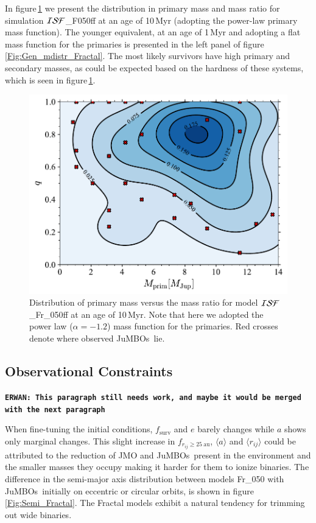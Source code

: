 \documentclass[submission,phys]{lib/SciPost}
\newcommand{\erwan}[1] {{\texttt{\textbf{ERWAN: #1}}} }
\newcommand{\jumbos}{\mbox{JuMBOs}}
\begin{document}
In figure\,\ref{Fig:SimTime_MPrimQ} we present the distribution in
primary mass and mass ratio for simulation ${\cal ISF}$\_F050ff at an
age of 10\,Myr (adopting the power-law primary mass function). The
younger equivalent, at an age of 1\,Myr and adopting a flat mass
function for the primaries is presented in the left panel of
figure\,\ref{Fig:Gen_mdistr_Fractal}.  The most likely survivors have
high primary and secondary masses, as could be expected based on the
hardness of these systems, which is seen in
figure\,\ref{Fig:SimTime_MPrimQ}.

\begin{figure}
    \centering
    \includegraphics[width=0.75\columnwidth]{figures/Fractal_rvir0.5_FF_10Myr_mass_distr.pdf}
    \caption{Distribution of primary mass versus the mass ratio for
      model ${\cal ISF}$\_Fr\_050ff at an age of 10\,Myr.  Note that
      here we adopted the power law ($\alpha = -1.2$) mass function
      for the primaries.  Red crosses denote where observed \jumbos\,
      lie.}
         \label{Fig:SimTime_MPrimQ}
\end{figure}

\subsection{Observational Constraints}

\erwan{This paragraph still needs work, and maybe it would be merged with the next paragraph}

When fine-tuning the initial conditions, $f_{\mathrm{surv}}$ and $e$
barely changes while $a$ shows only marginal changes.  This slight
increase in $f_{r_{ij}\geq25\ \mathrm{au}}$, $\langle a\rangle$ and
$\langle r_{ij}\rangle$ could be attributed to the reduction of JMO
and \jumbos\, present in the environment and the smaller masses they
occupy making it harder for them to ionize binaries. The difference in
the semi-major axis distribution between models Fr\_050 with \jumbos\,
initially on eccentric or circular orbits, is shown in figure
\ref{Fig:Semi_Fractal}. The Fractal models exhibit a natural tendency
for trimming out wide binaries.
    
\end{document}
